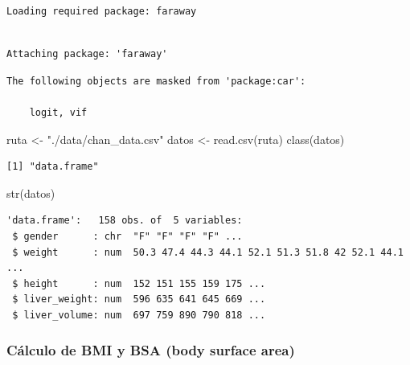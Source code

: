 \documentclass[
  letterpaper,
  DIV=11,
  numbers=noendperiod]{scrartcl}
\newenvironment{Shaded}{\begin{snugshade}}{\end{snugshade}}
\newcommand{\FunctionTok}[1]{\textcolor[rgb]{0.28,0.35,0.67}{#1}}
\newcommand{\NormalTok}[1]{\textcolor[rgb]{0.00,0.23,0.31}{#1}}
\newcommand{\OtherTok}[1]{\textcolor[rgb]{0.00,0.23,0.31}{#1}}
\newcommand{\StringTok}[1]{\textcolor[rgb]{0.13,0.47,0.30}{#1}}
\begin{document}
\begin{verbatim}
Loading required package: faraway
\end{verbatim}

\begin{verbatim}

Attaching package: 'faraway'
\end{verbatim}

\begin{verbatim}
The following objects are masked from 'package:car':

    logit, vif
\end{verbatim}

\begin{Shaded}
\begin{Highlighting}[]
\NormalTok{ruta }\OtherTok{\textless{}{-}} \StringTok{"./data/chan\_data.csv"}
\NormalTok{datos }\OtherTok{\textless{}{-}} \FunctionTok{read.csv}\NormalTok{(ruta)}
\FunctionTok{class}\NormalTok{(datos)}
\end{Highlighting}
\end{Shaded}

\begin{verbatim}
[1] "data.frame"
\end{verbatim}

\begin{Shaded}
\begin{Highlighting}[]
\FunctionTok{str}\NormalTok{(datos)}
\end{Highlighting}
\end{Shaded}

\begin{verbatim}
'data.frame':   158 obs. of  5 variables:
 $ gender      : chr  "F" "F" "F" "F" ...
 $ weight      : num  50.3 47.4 44.3 44.1 52.1 51.3 51.8 42 52.1 44.1 ...
 $ height      : num  152 151 155 159 175 ...
 $ liver_weight: num  596 635 641 645 669 ...
 $ liver_volume: num  697 759 890 790 818 ...
\end{verbatim}

\hypertarget{cuxe1lculo-de-bmi-y-bsa-body-surface-area}{%
\subsubsection{Cálculo de BMI y BSA (body surface
area)}\label{cuxe1lculo-de-bmi-y-bsa-body-surface-area}}
\end{document}
